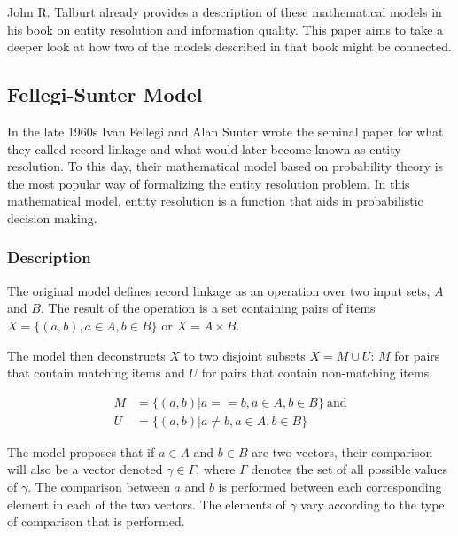 \documentclass[11pt]{article}
\begin{document}
    John R. Talburt already provides a description of these mathematical models
    in his book on entity resolution and information quality\cite{Tal11}.
    This paper aims to take a deeper look at how two of the models described in
    that book might be connected.

    \subsection[fsm]{Fellegi-Sunter Model}\label{subsec:fsm}

    In the late 1960s Ivan Fellegi and Alan Sunter wrote the seminal
    paper\cite{fs1969} for what they called record linkage and what would later
    become known as entity resolution.
    To this day, their mathematical model based on probability theory is the
    most popular way of formalizing the entity resolution problem.
    In this mathematical model, entity resolution is a function that aids in 
    probabilistic decision making.
    
    \subsubsection[fsm-desc]{Description}\label{subsec:fsm-desc}

    The original model defines record linkage as an operation over two input
    sets, $A$ and $B$.
    The result of the operation is a set containing pairs of items
    $X = \{(a, b), a \in A, b \in B\}$ or $X = A \times B$.
    
    The model then deconstructs $X$ to two disjoint subsets $X = M \cup U$: $M$ for pairs that
    contain matching items and $U$ for pairs that contain non-matching items.

    \begin{align}
        M &= \{(a, b) | a == b, a \in A, b \in B\}~\textrm{and} \\
        U &= \{(a, b) | a \neq b, a \in A, b \in B\}
    \end{align}

    The model proposes that if $a \in A$ and $b \in B$ are two vectors, their
    comparison will also be a vector denoted $\gamma \in \varGamma$, where
    $\varGamma$ denotes the set of all possible values of $\gamma$.
    The comparison between $a$ and $b$ is performed between each corresponding
    element in each of the two vectors.
    The elements of $\gamma$ vary according to the type of comparison that is
    performed\cite{winkler1990}.
\end{document}
